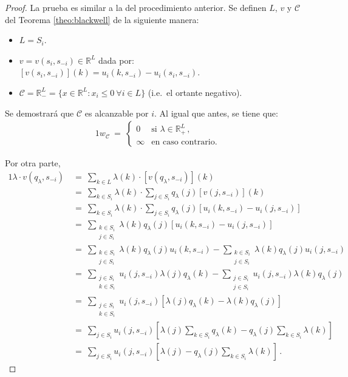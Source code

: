 \begin{proof}
La prueba es similar a la del procedimiento anterior. Se definen $L$, $v$ y $\mathcal{C}$ del Teorema \ref{theo:blackwell} de la siguiente manera:
\begin{itemize}[noitemsep]
  \item $L = S_i$.
  \item $v = v(s_i, s_{-i}) \in \mathbb{R}^L$ dada por:
    $[v(s_i, s_{-i})](k)=u_i(k, s_{-i}) - u_i(s_i, s_{-i})$.
  \item $\mathcal{C} = \mathbb{R}^L_- = \{x \in \mathbb{R}^L : x_i \leq 0\ \forall i \in L \}$ (i.e.\ el ortante negativo).
\end{itemize}

Se demostrará que $\mathcal{C}$ es alcanzable por $i$. Al igual que antes, se tiene que:
\begin{alignat}{1}
  w_{\mathcal{C}}\ =\ 
    \begin{cases}
	  0 & \text{si } \lambda \in \mathbb{R}^L_+ \,, \\
      \infty & \text{en caso contrario.}
    \end{cases}
\end{alignat}

Por otra parte,
\begin{alignat}{1}
	\lambda \cdot v(q_{\lambda}, s_{-i})\ 
	&=\ \sum_{k \in L} \lambda(k) \cdot [v(q_{\lambda}, s_{-i})](k) \\
	&=\ \sum_{k \in S_i} \lambda(k) \cdot \sum_{j \in S_i} q_{\lambda}(j)[v(j, s_{-i})] (k) \\
	&=\ \sum_{k \in S_i} \lambda(k) \cdot \sum_{j \in S_i} q_{\lambda}(j) [u_i(k, s_{-i}) - u_i(j, s_{-i})] \\
	&=\ \sum_{\substack{k \in S_i \\ j \in S_i}} \lambda(k) q_{\lambda}(j) [u_i(k, s_{-i}) - u_i(j, s_{-i})] \\
	&=\ \sum_{\substack{k \in S_i \\ j \in S_i}} \lambda(k) q_{\lambda}(j) u_i(k, s_{-i}) - \sum_{\substack{k \in S_i \\ j \in S_i}} \lambda(k) q_{\lambda}(j) u_i(j, s_{-i}) \\
	&=\ \sum_{\substack{j \in S_i \\ k \in S_i}} u_i(j, s_{-i}) \lambda(j) q_{\lambda}(k)  - \sum_{\substack{j \in S_i \\ j \in S_i}} u_i(j, s_{-i}) \lambda(k) q_{\lambda}(j) \\
	&=\ \sum_{\substack{j \in S_i \\ k \in S_i}} u_i(j, s_{-i}) [\lambda(j) q_{\lambda}(k)  - \lambda(k) q_{\lambda}(j)] \\
	&=\ \sum_{j \in S_i} u_i(j, s_{-i}) \left[ \lambda(j) \sum_{k \in S_i} q_{\lambda}(k)  - q_{\lambda}(j) \sum_{k \in S_i} \lambda(k)  \right] \\
	&=\ \sum_{j \in S_i} u_i(j, s_{-i}) \left[ \lambda(j) - q_{\lambda}(j) \sum_{k \in S_i} \lambda(k) \right] \,.
\end{alignat}


\end{proof}
